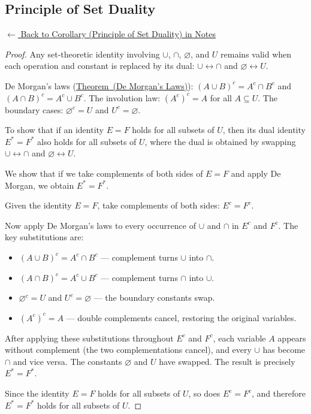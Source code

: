 
\subsection*{Principle of Set Duality}
\label{prf:set-duality}

\begin{remark*}[Return]
\hyperref[cor:set-duality]{$\leftarrow$ Back to Corollary (Principle of Set Duality) in Notes}
\end{remark*}

\begin{proof}
\Claim Any set-theoretic identity involving $\cup$, $\cap$, $\varnothing$, and $U$ remains valid when each operation and constant is replaced by its dual: $\cup \leftrightarrow \cap$ and $\varnothing \leftrightarrow U$.

\Given De Morgan's laws (\hyperref[thm:de-morgan]{Theorem~(De Morgan's Laws)}):
$(A \cup B)^c = A^c \cap B^c$ and $(A \cap B)^c = A^c \cup B^c$. The
involution law: $(A^c)^c = A$ for all $A \subseteq U$. The boundary cases:
$\varnothing^c = U$ and $U^c = \varnothing$.

\Goal To show that if an identity $E = F$ holds for all subsets of $U$, then
its dual identity $E^* = F^*$ also holds for all subsets of $U$, where the
dual is obtained by swapping $\cup \leftrightarrow \cap$ and $\varnothing
\leftrightarrow U$.

\Strategy We show that if we take complements of both sides of $E = F$ and
apply De Morgan, we obtain $E^* = F^*$.

\medskip
Given the identity $E = F$, take complements of both sides: $E^c = F^c$.

Now apply De Morgan's laws to every occurrence of $\cup$ and $\cap$ in $E^c$
and $F^c$. The key substitutions are:
\begin{itemize}
  \item $(A \cup B)^c = A^c \cap B^c$ — complement turns $\cup$ into $\cap$.
  \item $(A \cap B)^c = A^c \cup B^c$ — complement turns $\cap$ into $\cup$.
  \item $\varnothing^c = U$ and $U^c = \varnothing$ — the boundary constants
        swap.
  \item $(A^c)^c = A$ — double complements cancel, restoring the original
        variables.
\end{itemize}

After applying these substitutions throughout $E^c$ and $F^c$, each variable
$A$ appears without complement (the two complementations cancel), and every
$\cup$ has become $\cap$ and vice versa. The constants $\varnothing$ and $U$
have swapped. The result is precisely $E^* = F^*$.

Since the identity $E = F$ holds for all subsets of $U$, so does $E^c = F^c$,
and therefore $E^* = F^*$ holds for all subsets of $U$. \AsReq
\end{proof}

